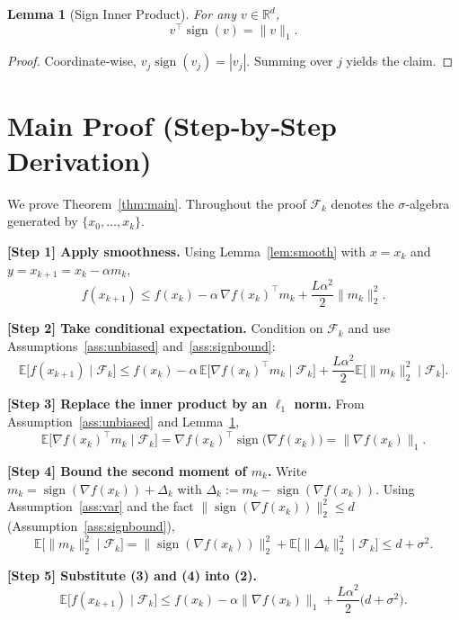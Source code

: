 \documentclass{article}
\newtheorem{lemma}{Lemma}
\newcommand{\sign}{\operatorname{sign}}
\newcommand{\E}{\mathbb{E}}
\newcommand{\R}{\mathbb{R}}
\begin{document}
\begin{lemma}[Sign Inner Product]\label{lem:signinner}
For any $v\in\R^{d}$,
\[
v^{\top}\sign(v)=\|v\|_{1}.
\]
\end{lemma}
\begin{proof}
Coordinate‑wise, $v_{j}\sign(v_{j})=|v_{j}|$. Summing over $j$ yields the claim. \qedhere
\end{proof}

\section*{Main Proof (Step‑by‑Step Derivation)}
We prove Theorem~\ref{thm:main}. Throughout the proof $\mathcal{F}_{k}$ denotes the $\sigma$‑algebra generated by $\{x_{0},\dots ,x_{k}\}$.

\bigskip
\noindent\textbf{[Step 1] Apply smoothness.}
Using Lemma~\ref{lem:smooth} with $x=x_{k}$ and $y=x_{k+1}=x_{k}-\alpha m_{k}$,
\[
f(x_{k+1})\le f(x_{k})-\alpha\,\nabla f(x_{k})^{\top}m_{k}
+\frac{L\alpha^{2}}{2}\|m_{k}\|_{2}^{2}. \tag{1}
\]

\noindent\textbf{[Step 2] Take conditional expectation.}
Condition on $\mathcal{F}_{k}$ and use Assumptions~\ref{ass:unbiased} and~\ref{ass:signbound}:
\[
\E\!\bigl[f(x_{k+1})\mid\mathcal{F}_{k}\bigr]
\le f(x_{k})-\alpha\,\E\!\bigl[\nabla f(x_{k})^{\top}m_{k}\mid\mathcal{F}_{k}\bigr]
+\frac{L\alpha^{2}}{2}\E\!\bigl[\|m_{k}\|_{2}^{2}\mid\mathcal{F}_{k}\bigr]. \tag{2}
\]

\noindent\textbf{[Step 3] Replace the inner product by an $\ell_{1}$ norm.}
From Assumption~\ref{ass:unbiased} and Lemma~\ref{lem:signinner},
\[
\E\!\bigl[\nabla f(x_{k})^{\top}m_{k}\mid\mathcal{F}_{k}\bigr]
= \nabla f(x_{k})^{\top}\sign\!\bigl(\nabla f(x_{k})\bigr)
= \|\nabla f(x_{k})\|_{1}. \tag{3}
\]

\noindent\textbf{[Step 4] Bound the second moment of $m_{k}$.}
Write $m_{k}= \sign(\nabla f(x_{k}))+ \Delta_{k}$ with $\Delta_{k}:=m_{k}-\sign(\nabla f(x_{k}))$.  
Using Assumption~\ref{ass:var} and the fact $\|\sign(\nabla f(x_{k}))\|_{2}^{2}\le d$ (Assumption~\ref{ass:signbound}),
\[
\E\!\bigl[\|m_{k}\|_{2}^{2}\mid\mathcal{F}_{k}\bigr]
= \|\sign(\nabla f(x_{k}))\|_{2}^{2}
   +\E\!\bigl[\|\Delta_{k}\|_{2}^{2}\mid\mathcal{F}_{k}\bigr]
\le d+\sigma^{2}. \tag{4}
\]

\noindent\textbf{[Step 5] Substitute (3) and (4) into (2).}
\[
\E\!\bigl[f(x_{k+1})\mid\mathcal{F}_{k}\bigr]
\le f(x_{k})-\alpha\|\nabla f(x_{k})\|_{1}
+\frac{L\alpha^{2}}{2}\bigl(d+\sigma^{2}\bigr). \tag{5}
\]
\end{document}
